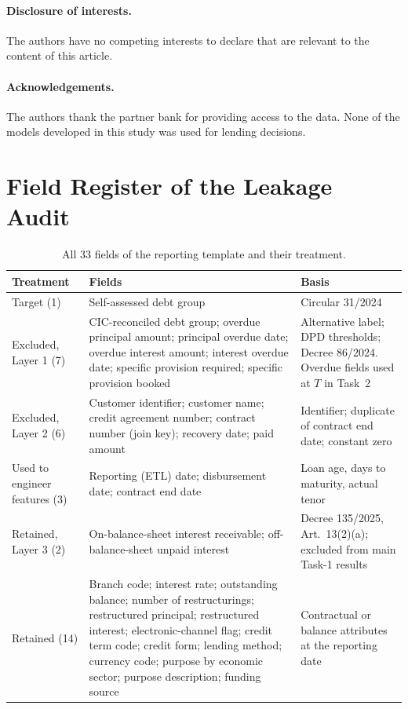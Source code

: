 \documentclass[runningheads]{llncs}
\begin{document}
\paragraph{Disclosure of interests.} The authors have no competing interests to declare that are relevant to the content of this article.

\paragraph{Acknowledgements.} The authors thank the partner bank for providing access to the data. None of the models developed in this study was used for lending decisions.

\appendix

\section{Field Register of the Leakage Audit}
\label{app:register}

\begin{table}[!htbp]
\centering
\caption{All 33 fields of the reporting template and their treatment.}
\label{tab:register}
\scriptsize
\begin{tabular}{@{}>{\raggedright\arraybackslash}p{2.6cm}>{\raggedright\arraybackslash}p{6.6cm}>{\raggedright\arraybackslash}p{2.4cm}@{}}
\toprule
Treatment & Fields & Basis\\
\midrule
Target (1) & Self-assessed debt group & Circular 31/2024\\
Excluded, Layer 1 (7) & CIC-reconciled debt group; overdue principal amount; principal overdue date; overdue interest amount; interest overdue date; specific provision required; specific provision booked & Alternative label; DPD thresholds; Decree 86/2024. Overdue fields used at $T$ in Task~2\\
Excluded, Layer 2 (6) & Customer identifier; customer name; credit agreement number; contract number (join key); recovery date; paid amount & Identifier; duplicate of contract end date; constant zero\\
Used to engineer features (3) & Reporting (ETL) date; disbursement date; contract end date & Loan age, days to maturity, actual tenor\\
Retained, Layer 3 (2) & On-balance-sheet interest receivable; off-balance-sheet unpaid interest & Decree 135/2025, Art.~13(2)(a); excluded from main Task-1 results\\
Retained (14) & Branch code; interest rate; outstanding balance; number of restructurings; restructured principal; restructured interest; electronic-channel flag; credit term code; credit form; lending method; currency code; purpose by economic sector; purpose description; funding source & Contractual or balance attributes at the reporting date\\
\bottomrule
\end{tabular}
\end{table}

\FloatBarrier


\end{document}
